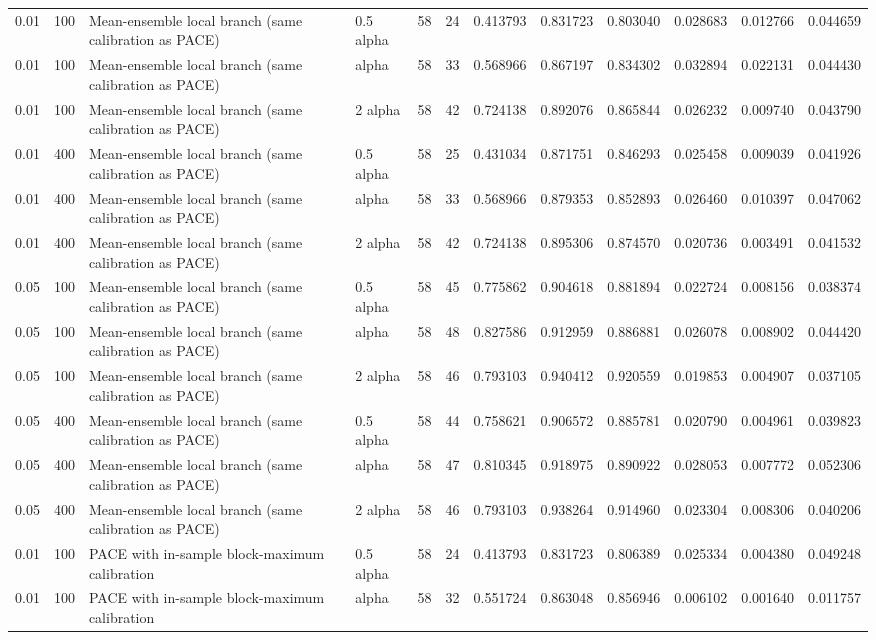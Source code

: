 \begin{tabular}{llllllllllll}
0.01 & 100 & Mean-ensemble local branch (same calibration as PACE) & 0.5 alpha & 58 & 24 & 0.413793 & 0.831723 & 0.803040 & 0.028683 & 0.012766 & 0.044659 \\
0.01 & 100 & Mean-ensemble local branch (same calibration as PACE) & alpha & 58 & 33 & 0.568966 & 0.867197 & 0.834302 & 0.032894 & 0.022131 & 0.044430 \\
0.01 & 100 & Mean-ensemble local branch (same calibration as PACE) & 2 alpha & 58 & 42 & 0.724138 & 0.892076 & 0.865844 & 0.026232 & 0.009740 & 0.043790 \\
0.01 & 400 & Mean-ensemble local branch (same calibration as PACE) & 0.5 alpha & 58 & 25 & 0.431034 & 0.871751 & 0.846293 & 0.025458 & 0.009039 & 0.041926 \\
0.01 & 400 & Mean-ensemble local branch (same calibration as PACE) & alpha & 58 & 33 & 0.568966 & 0.879353 & 0.852893 & 0.026460 & 0.010397 & 0.047062 \\
0.01 & 400 & Mean-ensemble local branch (same calibration as PACE) & 2 alpha & 58 & 42 & 0.724138 & 0.895306 & 0.874570 & 0.020736 & 0.003491 & 0.041532 \\
0.05 & 100 & Mean-ensemble local branch (same calibration as PACE) & 0.5 alpha & 58 & 45 & 0.775862 & 0.904618 & 0.881894 & 0.022724 & 0.008156 & 0.038374 \\
0.05 & 100 & Mean-ensemble local branch (same calibration as PACE) & alpha & 58 & 48 & 0.827586 & 0.912959 & 0.886881 & 0.026078 & 0.008902 & 0.044420 \\
0.05 & 100 & Mean-ensemble local branch (same calibration as PACE) & 2 alpha & 58 & 46 & 0.793103 & 0.940412 & 0.920559 & 0.019853 & 0.004907 & 0.037105 \\
0.05 & 400 & Mean-ensemble local branch (same calibration as PACE) & 0.5 alpha & 58 & 44 & 0.758621 & 0.906572 & 0.885781 & 0.020790 & 0.004961 & 0.039823 \\
0.05 & 400 & Mean-ensemble local branch (same calibration as PACE) & alpha & 58 & 47 & 0.810345 & 0.918975 & 0.890922 & 0.028053 & 0.007772 & 0.052306 \\
0.05 & 400 & Mean-ensemble local branch (same calibration as PACE) & 2 alpha & 58 & 46 & 0.793103 & 0.938264 & 0.914960 & 0.023304 & 0.008306 & 0.040206 \\
0.01 & 100 & PACE with in-sample block-maximum calibration & 0.5 alpha & 58 & 24 & 0.413793 & 0.831723 & 0.806389 & 0.025334 & 0.004380 & 0.049248 \\
0.01 & 100 & PACE with in-sample block-maximum calibration & alpha & 58 & 32 & 0.551724 & 0.863048 & 0.856946 & 0.006102 & 0.001640 & 0.011757 \\

\end{tabular}
